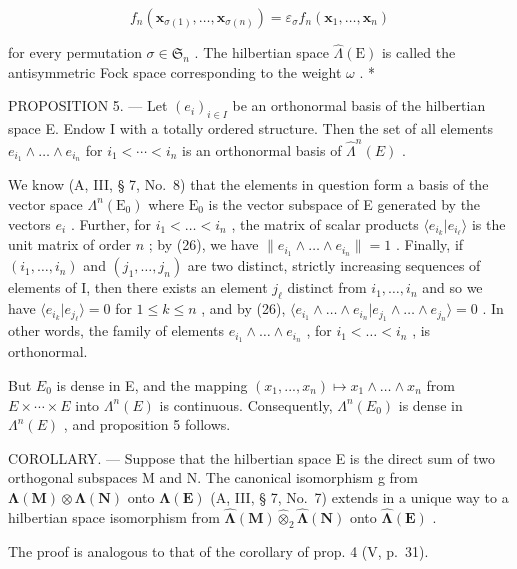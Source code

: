\[
f _ {n} (\mathbf {x} _ {\sigma (1)}, \dots , \mathbf {x} _ {\sigma (n)}) = \varepsilon_ {\sigma} f _ {n} (\mathbf {x} _ {1}, \dots , \mathbf {x} _ {n})
\]

for every permutation \(\sigma \in \mathfrak{S}_n\) . The hilbertian space \(\hat{\Lambda}(\mathrm{E})\) is called the antisymmetric Fock space corresponding to the weight \(\omega\) . *

PROPOSITION 5. --- Let \((e_i)_{i \in I}\) be an orthonormal basis of the hilbertian space E. Endow I with a totally ordered structure. Then the set of all elements \(e_{i_1} \wedge \ldots \wedge e_{i_n}\) for \(i_1 < \cdots < i_n\) is an orthonormal basis of \(\hat{\Lambda}^n(E)\) .

We know (A, III, § 7, No.~8) that the elements in question form a basis of the vector space \(\Lambda^n (\mathrm{E}_0)\) where \(\mathrm{E}_0\) is the vector subspace of E generated by the vectors \(e_i\) . Further, for \(i_1 < \dots < i_n\) , the matrix of scalar products \(\langle e_{i_k}|e_{i_\ell}\rangle\) is the unit matrix of order \(n\) ; by (26), we have \(\| e_{i_1}\wedge \ldots \wedge e_{i_n}\| = 1\) . Finally, if \((i_1,\dots,i_n)\) and \((j_1,\dots,j_n)\) are two distinct, strictly increasing sequences of elements of I, then there exists an element \(j_\ell\) distinct from \(i_1,\ldots ,i_n\) and so we have \(\langle e_{i_k}|e_{j_\ell}\rangle = 0\) for \(1\leqslant k\leqslant n\) , and by (26), \(\langle e_{i_1}\wedge \ldots \wedge e_{i_n}|e_{j_1}\wedge \ldots \wedge e_{j_n}\rangle = 0\) . In other words, the family of elements \(e_{i_1}\wedge \ldots \wedge e_{i_n}\) , for \(i_1 < \dots < i_n\) , is orthonormal.

But \(E_{0}\) is dense in E, and the mapping \((x_{1},...,x_{n})\mapsto x_{1}\wedge\ldots\wedge x_{n}\) from \(E\times\cdots\times E\) into \(\Lambda^{n}(E)\) is continuous. Consequently, \(\Lambda^{n}(E_{0})\) is dense in \(\Lambda^{n}(E)\) , and proposition 5 follows.

COROLLARY. --- Suppose that the hilbertian space E is the direct sum of two orthogonal subspaces M and N. The canonical isomorphism g from \(\symbf{\Lambda}(\mathbf{M})\otimes\symbf{\Lambda}(\mathbf{N})\) onto \(\symbf{\Lambda}(\mathbf{E})\) (A, III, § 7, No.~7) extends in a unique way to a hilbertian space isomorphism from \(\hat{\symbf{\Lambda}}(\mathbf{M})\hat{\otimes}_{2}\hat{\symbf{\Lambda}}(\mathbf{N})\) onto \(\hat{\symbf{\Lambda}}(\mathbf{E})\) .

The proof is analogous to that of the corollary of prop. 4 (V, p.~31).


